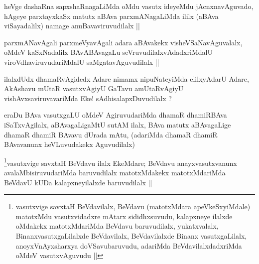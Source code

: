 
\begin{artha}
heVge dashaRna sapxshaRnagaLiMda oMdu vasutx ideyeMdu jAcnxnavAguvado,
hAgeye parxtayxkaSx matutx aBAva parxmANagaLiMda ililx (aBAva
viSayadalilx) namage anuBavaviruvudilalx ||
\end{artha}

\begin{artha}
parxmANavAgali parxmeVyavAgali adara aBAvakekx visheVSaNavAguvalalx,
oMdeV kaSxNadalilx BAvABAvagaLu seVruvudilalxvAdadxriMdalU
viroVdhaviruvudariMdalU saMgatavAguvudilalx ||
\end{artha}


\begin{artha}
ilalxdUdx dhamaRvAgidedx Adare nimamx nipuNateyiMda elilxyAdarU Adare,
AkAshavu mUtaR vasutxvAgiyU GaTavu amUtaRvAgiyU vishAvxsaviruvavariMda
Eke! sAdhisalapxDuvudilalx ?
\end{artha}


\begin{artha}
eraDu BAva vasutxgaLU oMdeV AgiruvudariMda dhamaR dhamiRBAva
iSaTxvAgilalx, aBAvagaLigaMtU sutAM ilalx, BAva matutx aBAvagaLige
dhamaR dhamiR BAvavu dUrada mAtu, (adariMda dhamaR dhamiR BAvavanunx
heVLuvudakekx Aguvudilalx)
\end{artha}

\begin{artha}
\footnote[1]{vasutxvige savxtaH BeVdavilalx, BeVdavu (matotxMdara
  apeVkeSxyiMdale) matotxMdu vasutxvidadxre mAtarx sididhxsuvudu,
  kalapxneye ilalxde oMdakekx matotxMdariMda BeVdavu baruvudilalx,
  yukatxvalalx, BinanxvasutxgaLilalxde BeVdavilalx, BeVdavilalxde
  Binanx vasutxgaLilalx, anoyxVnAyxsharxya doVSavubaruvudu, adariMda
  BeVdavilalxdadxriMda oMdeV vasutxvAguvudu ||}vasutxvige savxtaH BeVdavu ilalx EkeMdare; BeVdavu
anayxvasutxvanunx avalaMbisiruvudariMda baruvudilalx matotxMdakekx
matotxMdariMda BeVdavU kUDa kalapxneyilalxde baruvudilalx ||
\end{artha}



